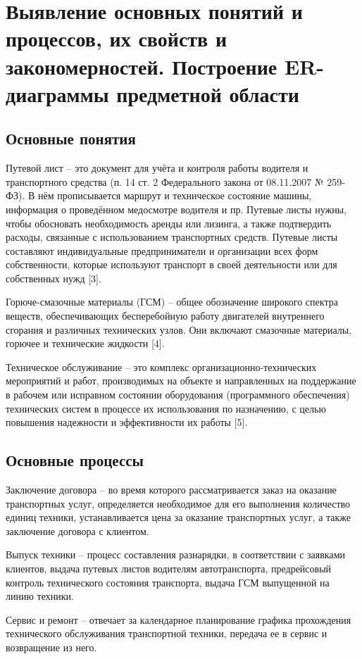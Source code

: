 \documentclass[../nirs.tex]{subfiles}
\begin{document}
\section{Выявление основных понятий и процессов, их свойств и закономерностей.
Построение ER-диаграммы предметной области}

\subsection{Основные понятия}
Путевой лист -- это документ для учёта и контроля работы водителя и
транспортного средства (п. 14 ст. 2 Федерального закона от 08.11.2007 № 259-ФЗ).
В нём прописывается маршрут и техническое состояние машины, информация о
проведённом медосмотре водителя и пр. Путевые листы нужны, чтобы обосновать
необходимость аренды или лизинга, а также подтвердить расходы, связанные с
использованием транспортных средств. Путевые листы составляют индивидуальные
предприниматели и организации всех форм собственности, которые используют
транспорт в своей деятельности или для собственных нужд [3].

Горюче-смазочные материалы (ГСМ) -- общее обозначение широкого спектра веществ,
обеспечивающих бесперебойную работу двигателей внутреннего сгорания и различных
технических узлов. Они включают смазочные материалы, горючее и технические
жидкости [4].

Техническое обслуживание -- это комплекс организационно-технических мероприятий
и работ, производимых на объекте и направленных на поддержание в рабочем или
исправном состоянии оборудования (программного обеспечения) технических систем в
процессе их использования по назначению, с целью повышения надежности и
эффективности их работы [5].

\subsection{Основные процессы}
Заключение договора -- во время которого рассматривается заказ на оказание
транспортных услуг, определяется необходимое для его выполнения количество
единиц техники, устанавливается цена за оказание транспортных услуг, а также
заключение договора с клиентом.

Выпуск техники -- процесс составления разнарядки, в соответствии с заявками
клиентов, выдача путевых листов водителям автотранспорта, предрейсовый контроль
технического состояния транспорта, выдача ГСМ выпущенной на линию техники.

Сервис и ремонт -- отвечает за календарное планирование графика прохождения
технического обслуживания транспортной техники, передача ее в сервис и
возвращение из него.
\end{document}
